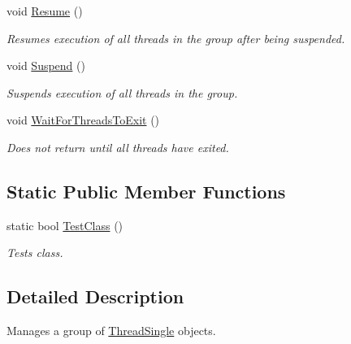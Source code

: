 \begin{DoxyCompactItemize}
void \hyperlink{class_thread_single_group_aaee0da337872b47f714675701d82b883}{Resume} ()
\begin{DoxyCompactList}\small\item\em Resumes execution of all threads in the group after being suspended. \item\end{DoxyCompactList}\item 
void \hyperlink{class_thread_single_group_a0742cd78d822bcefbbafadc5dc044fbf}{Suspend} ()
\begin{DoxyCompactList}\small\item\em Suspends execution of all threads in the group. \item\end{DoxyCompactList}\item 
\hypertarget{class_thread_single_group_a69112aa6762e363d3b8c07ff713a8198}{
void \hyperlink{class_thread_single_group_a69112aa6762e363d3b8c07ff713a8198}{WaitForThreadsToExit} ()}
\label{class_thread_single_group_a69112aa6762e363d3b8c07ff713a8198}

\begin{DoxyCompactList}\small\item\em Does not return until all threads have exited. \item\end{DoxyCompactList}\end{DoxyCompactItemize}
\subsection*{Static Public Member Functions}
\begin{DoxyCompactItemize}
\item 
static bool \hyperlink{class_thread_single_group_a26f35ba9c432a49de2ca2e446add6888}{TestClass} ()
\begin{DoxyCompactList}\small\item\em Tests class. \item\end{DoxyCompactList}\end{DoxyCompactItemize}


\subsection{Detailed Description}
Manages a group of \hyperlink{class_thread_single}{ThreadSingle} objects. 

